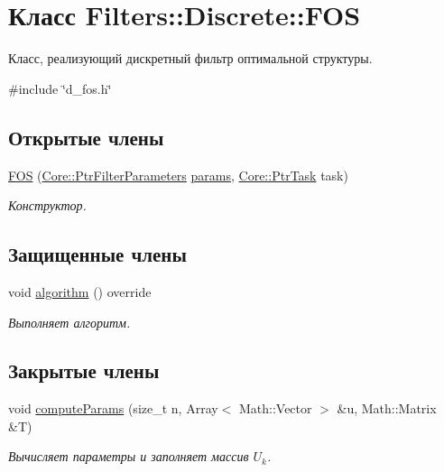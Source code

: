 \hypertarget{class_filters_1_1_discrete_1_1_f_o_s}{}\section{Класс Filters\+:\+:Discrete\+:\+:F\+OS}
\label{class_filters_1_1_discrete_1_1_f_o_s}


Класс, реализующий дискретный фильтр оптимальной структуры.  




{\ttfamily \#include \char`\"{}d\+\_\+fos.\+h\char`\"{}}

\subsection*{Открытые члены}
\begin{DoxyCompactItemize}
\item 
\hypertarget{class_filters_1_1_discrete_1_1_f_o_s_a4ccb53bc00846f7ca140b55316241749}{}\label{class_filters_1_1_discrete_1_1_f_o_s_a4ccb53bc00846f7ca140b55316241749} 
\hyperlink{class_filters_1_1_discrete_1_1_f_o_s_a4ccb53bc00846f7ca140b55316241749}{F\+OS} (\hyperlink{namespace_core_a4811af8148ba137d644b9a61a042cf03}{Core\+::\+Ptr\+Filter\+Parameters} \hyperlink{class_core_1_1_filter_a44aa749b49ba46256975ce545531ecf7}{params}, \hyperlink{namespace_core_abfda8f69fcacfcea2696549b548ed737}{Core\+::\+Ptr\+Task} task)
\begin{DoxyCompactList}\small\item\em Конструктор. \end{DoxyCompactList}\end{DoxyCompactItemize}
\subsection*{Защищенные члены}
\begin{DoxyCompactItemize}
\item 
void \hyperlink{class_filters_1_1_discrete_1_1_f_o_s_a66b52dd04e77257393fe156b71e5582f}{algorithm} () override
\begin{DoxyCompactList}\small\item\em Выполняет алгоритм. \end{DoxyCompactList}\end{DoxyCompactItemize}
\subsection*{Закрытые члены}
\begin{DoxyCompactItemize}
\item 
void \hyperlink{class_filters_1_1_discrete_1_1_f_o_s_ac00393ddad3a1ba203e09db8cbc52944}{compute\+Params} (size\+\_\+t n, Array$<$ Math\+::\+Vector $>$ \&u, Math\+::\+Matrix \&T)
\begin{DoxyCompactList}\small\item\em Вычисляет параметры и заполняет массив $U_k$. \end{DoxyCompactList}\end{DoxyCompactItemize}
